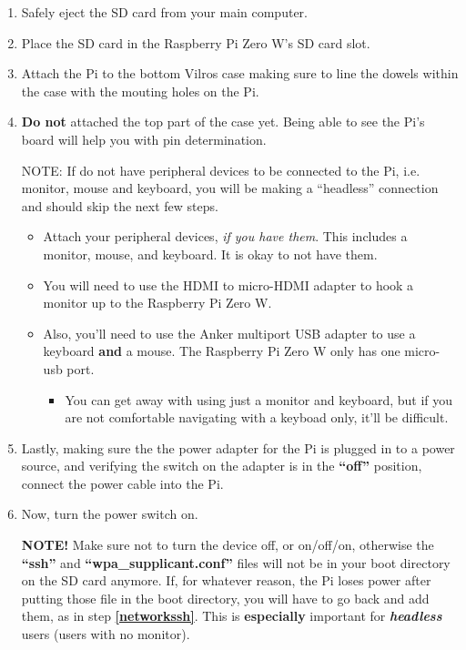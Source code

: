 \documentclass{article}
\begin{document}
\begin{enumerate}
  \item Safely eject the SD card from your main computer.
  \item Place the SD card in the Raspberry Pi Zero W's SD card slot.
  \item Attach the Pi to the bottom Vilros case making sure to line the dowels within the case with the mouting holes on the Pi.
  \item \textbf{Do not} attached the top part of the case yet. Being able to see the Pi's board will help you with pin determination.
  
NOTE: If do not have peripheral devices to be connected to the Pi, i.e. monitor, mouse and keyboard, you will be making a ``headless'' connection and should skip the next few steps. 
\begin{itemize}
  \item Attach your peripheral devices, \textit{if you have them}. This includes a monitor, mouse, and keyboard. It is okay to not have them.
    \item You will need to use the HDMI to micro-HDMI adapter to hook a monitor up to the Raspberry Pi Zero W.
    \item Also, you'll need to use the Anker multiport USB adapter to use a keyboard \textbf{and} a mouse. The Raspberry Pi Zero W only has one micro-usb port.
    \begin{itemize}
     \item You can get away with using just a monitor and keyboard, but if you are not comfortable navigating with a keyboad only, it'll be difficult.
    \end{itemize}
  \end{itemize}
  
  
\item Lastly, making sure the the power adapter for the Pi is plugged in to a power source, and verifying the switch on the adapter is in the \textbf{``off''} position, connect the power cable into the Pi.
  \item Now, turn the power switch on.

\textbf{NOTE!} Make sure not to turn the device off, or on/off/on, otherwise the \textbf{``ssh''} and \textbf{``wpa\_supplicant.conf''} files will not be in your boot directory on the SD card anymore. If, for whatever reason, the Pi loses power after putting those file in the boot directory, you will have to go back and add them, as in step \textbf{\ref{networkssh}}. This is \textbf{especially} important for \textbf{\textit{headless}} users (users with no monitor).


\end{enumerate}
\end{document}
